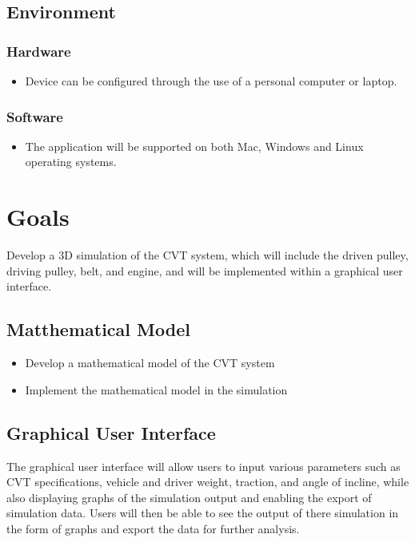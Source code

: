 \documentclass{article}
\begin{document}
\subsection{Environment}
\subsubsection{Hardware}
\begin{itemize}
    \item Device can be configured through the use of a personal computer or laptop.
\end{itemize}
    \subsubsection{Software}
\begin{itemize}
    \item The application will be supported on both Mac, Windows and Linux operating
    systems.
\end{itemize}

\section{Goals}

Develop a 3D simulation of the CVT system, which will include the driven pulley, driving pulley, belt, and engine, and will be implemented within a graphical user interface.
\subsection{Matthematical Model}
    \begin{itemize}
        \item Develop a mathematical model of the CVT system
        \item Implement the mathematical model in the simulation
    \end{itemize}
\subsection{Graphical User Interface}
The graphical user interface will allow users to input various parameters such as CVT specifications, vehicle and driver weight, traction, and angle of incline, while also displaying graphs of the simulation output and enabling the export of simulation data. 
Users will then be able to see the output of there simulation in the form of graphs and export the data for further analysis. 
\end{document}
